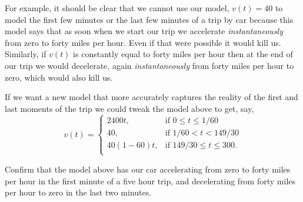 For example, it should be clear that we cannot use our model,
$v(t) = 40$ to model the first few minutes or the last few minutes of
a trip by car because this model says that as soon when we start our
trip we accelerate \emph{instantaneously} from zero to forty miles per
hour. Even if that were possible it would kill us. Similarly, if
$v(t)$ is constantly equal to forty miles per hour then at the end of
our trip we would decelerate, again \emph{instantaneously} from forty
miles per hour to zero, which would also kill us.

If we want a new model that more accurately captures the reality of
the first and last moments of the trip we could tweak the model above
to get, say,
$$
v(t) =
\begin{cases}
  2400t,& \text{if $0\le t \le 1/60$}\\
  40,  &  \text{if $1/60<t<149/30$}\\
  40(1-60)t,& \text{if $149/30\le t \le 300$}.\\
\end{cases}
$$

\begin{ProficiencyDrill}
  Confirm that the model above has our car accelerating from zero to
  forty miles per hour in the first minute of a five hour trip, and
  decelerating from forty miles per hour to zero in the last two
  minutes.
\end{ProficiencyDrill}





